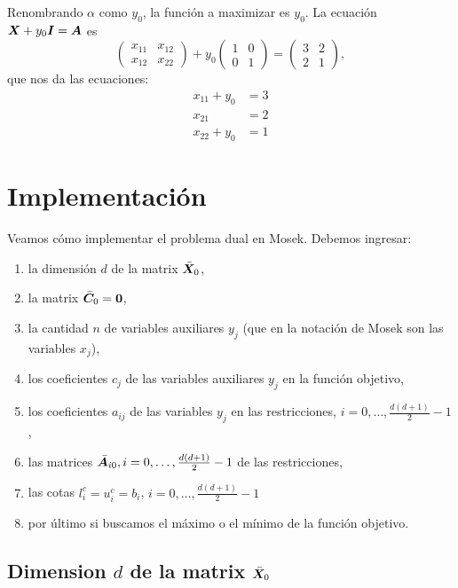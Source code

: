 \documentclass[11pt]{article}
\begin{document}
Renombrando $\alpha$ como $y_0$, la función a maximizar es $y_0$. La ecuación $\bm{X} + y_0 \bm{I} = \bm{A}$ es
$$
\begin{pmatrix} x_{11} & x_{12} \\ x_{12} & x_{22} \end{pmatrix} + y_0 \begin{pmatrix}
1 & 0 \\
0 & 1
\end{pmatrix} = \begin{pmatrix}
3 & 2 \\
2 & 1
\end{pmatrix},
$$
que nos da las ecuaciones:
\begin{align*}
x_{11} + y_0 &= 3 \\
x_{21} &= 2 \\
x_{22} + y_0 &= 1
\end{align*}

\section{Implementación}

Veamos cómo implementar el problema dual en Mosek. Debemos ingresar:
\begin{enumerate}
\item la dimensión $d$ de la matrix $\bar {\bm{X}}_0$,
\item la matrix $\bar {\bm{C}}_0 = \bm{0}$,
\item la cantidad $n$ de variables auxiliares $y_j$ (que en la notación de Mosek son las variables $x_j$),
\item los coeficientes $c_j$ de las variables auxiliares $y_j$ en la función objetivo,
\item los coeficientes $a_{ij}$ de las variables $y_j$ en las restricciones, $i = 0, \dots, \frac{d(d+1)}{2}-1$,
\item las matrices $\bar {\bm{A}}_{i0}, i = 0, \dots, \frac{d(d+1)}{2}-1$ de las restricciones,
\item las cotas $l_i^c = u_i^c = b_i$, $i = 0, \dots, \frac{d(d+1)}{2}-1$
\item por último si buscamos el máximo o el mínimo de la función objetivo.
\end{enumerate}

\subsection{Dimension $d$ de la matrix $\bar {\bm{X}}_0$}
\end{document}
